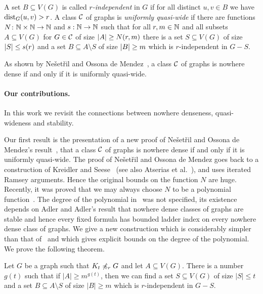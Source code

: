 \begin{definition}
A set $B\subseteq V(G)$ is called {\em{$r$-independent}} in $G$ if for all
distinct $u,v\in B$ we have $\mathrm{dist}_G(u,v)>r$.
A class $\mathcal{C}$ of graphs is \emph{uniformly quasi-wide} if there are
functions $N\colon \mathbb{N}\times\mathbb{N}\rightarrow \mathbb{N}$ and $s:\mathbb{N}\rightarrow \mathbb{N}$ such
that for all $r,m\in \mathbb{N}$ and all subsets $A\subseteq V(G)$ for
$G\in \mathcal{C}$ of size $\left\lvert A\right\rvert\geq N(r,m)$ there is a set
$S\subseteq V(G)$ of size $\left\lvert S\right\rvert\leq s(r)$ and a set
$B\subseteq A\setminus S$ of size $\left\lvert B\right\rvert\geq m$ which is $r$-independent in
$G-S$. 
\end{definition}

As shown by Ne\v{s}et\v{r}il and Ossona de Mendez~\cite{nevsetvril2010first},
a class $\mathcal{C}$ of graphs is nowhere dense if and only if it
is uniformly quasi-wide.

\paragraph{Our contributions.} In this work we revisit the 
connections between nowhere denseness, quasi-wideness and
stability. 

Our first result is the presentation of a new proof of 
Ne\v{s}et\v{r}il and Ossona de Mendez's result~\cite{nevsetvril2010first},
that a class $\mathcal{C}$ of graphs is nowhere dense if and only if it
is uniformly quasi-wide. The proof of Ne\v{s}et\v{r}il 
and Ossona de Mendez goes back to a construction
of Kreidler and Seese~\cite{kreidler1998monadic} (see also Atserias et al.~\cite{atserias2006preservation}), 
and uses iterated Ramsey arguments. Hence the original bounds on 
the function $N$ are huge. Recently, 
it was proved that we may always choose $N$ to be a polynomial 
function~\cite{siebertz2016polynomial}. The degree of the polynomial 
in~\cite{siebertz2016polynomial} was  not specified, its existence 
depends on Adler and Adler's result that nowhere dense classes of graphs
are stable and hence every fixed formula has bounded ladder index 
on every nowhere dense class of graphs. We give a new construction 
which is considerably simpler than that of~\cite{siebertz2016polynomial}
and which gives explicit bounds on the degree of the polynomial. 
We prove the following theorem. 

\begin{theorem}\label{thm:new-uqw}
Let $G$ be a graph such that $K_t\not\preccurlyeq_r G$ and let $A\subseteq V(G)$. 
There is a number $g(t)$ such that if $|A|\geq m^{g(t)}$, then we can find a set
$S\subseteq V(G)$ of size $|S|\leq t$ and a set $B\subseteq A\setminus S$ 
of size $|B|\geq m$ which is $r$-independent in $G-S$.  
\end{theorem}

